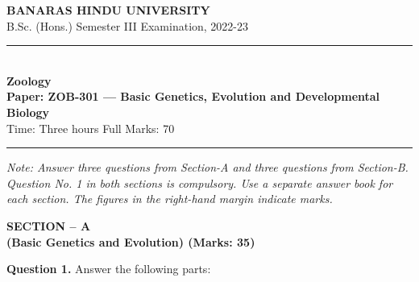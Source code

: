 \documentclass[11pt,a4paper]{article}
\begin{document}
\begin{center}
  {\large\bfseries BANARAS HINDU UNIVERSITY}\\[2pt]
  {\normalsize B.Sc. (Hons.) Semester III Examination, 2022-23}\\[6pt]
  \rule{0.8\linewidth}{0.5pt}\\[6pt]
  {\large\bfseries Zoology}\\[4pt]
  {\large\bfseries Paper: ZOB-301 --- Basic Genetics, Evolution and Developmental Biology}\\[4pt]
  {\normalsize Time: Three hours \hfill Full Marks: 70}
\end{center}

\rule{\linewidth}{0.4pt}

\smallskip



\noindent   \textit{Note: Answer three questions from Section-A and three questions from Section-B. Question No. 1 in both sections is compulsory. Use a separate answer book for each section. The figures in the right-hand margin indicate marks.}

\bigskip

\begin{center}
   \textbf{SECTION -- A} \\
   \textbf{(Basic Genetics and Evolution) (Marks: 35)}
\end{center}

\medskip


\noindent   \textbf{Question 1.} Answer the following parts:
\end{document}
